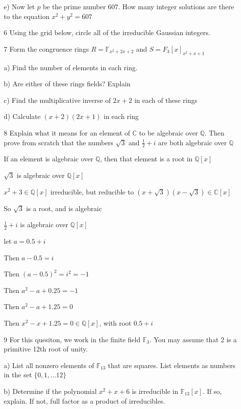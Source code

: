 \documentclass[12pt]{article}
\begin{document}
\begin{itemize}
		e) Now let $p$ be the prime number $607$. How many integer solutions are there to the equation $x^2 + y^2 = 607$

	\item[6] Using the grid below, circle all of the irreducible Gaussian integers.

	\item[7] Form the congruence rings $R = \mathbb{F}_{x^2 + 2x + 2}$ and $S = F_3[x]_{x^2 + x + 1}$

		a) Find the number of elements in each ring.

		b) Are either of these rings fields? Explain

		c) Find the multiplicative inverse of $2x +2$ in each of these rings

		d) Calculate $(x+2)(2x+1)$ in each ring

	\item[8] Explain what it means for an element of $\mathbb{C}$ to be algebraic over $\mathbb{Q}$. Then prove from scratch that the numbers $\sqrt{3}$ and $\frac{1}{2} + i$ are both algebraic over $\mathbb{Q}$

		If an element is algebraic over $\mathbb{Q}$, then that element is a root in $\mathbb{Q}[x]$

		$\sqrt{3}$ is algebraic over $\mathbb{Q}[x]$

		$x^2 + 3 \in\mathbb{Q}[x]$ irreducible, but reducible to $(x + \sqrt{3})(x-\sqrt{3})\in\mathbb{C}[x]$

		So $\sqrt{3}$ is a root, and is algebraic

		$\frac{1}{2} + i$ is algebraic over $\mathbb{Q}[x]$

		let $a = 0.5 + i$

		Then $a - 0.5 = i$

		Then $(a - 0.5)^2 = i^2 = -1$

		Then $a^2 - a + 0.25 = -1$

		Then $a^2 - a + 1.25 = 0$

		Then $x^2 - x + 1.25 = 0 \in \mathbb{Q}[x]$, with root $0.5 + i$ 

	\item[9] For this quesiton, we work in the finite field $\mathbb{F}_{3}$. You may assume that $2$ is a primitive 12th root of unity.

		a) List all nonzero elements of $\mathbb{F}_{13}$ that are squares. List elements as numbers in the set $\{0,1,...12\}$

		b) Determine if the polynomial $x^2 + x + 6$ is irreducible in $\mathbb{F}_{13}[x]$. If so, explain. If not, full factor as a product of irreducibles.


\end{itemize}
\end{document}
